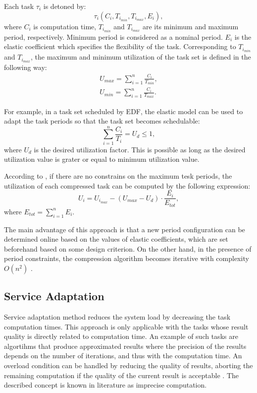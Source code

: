 Each task $\tau_i$ is detoned by:
\begin{equation*}
\tau_i(C_i, T_{i_{min}}, T_{i_{max}}, E_i),
\end{equation*}
where $C_i$ is computation time, $T_{i_{min}}$ and $T_{i_{max}}$ are its minimum and maximum period, respectively.
Minimum period is considered as a nominal period. 
 $E_i$ is the elastic coefficient which specifies the flexibility of the task.
Corresponding to $T_{i_{min}}$ and $T_{i_{max}}$, the maximum and minimum utilization of the task set is defined in the following way:
\begin{align*}
U_{max} = \sum_{i=1}^{n}\frac{C_i}{T_{min}},\\
U_{min} = \sum_{i=1}^{n}\frac{C_i}{T_{max}}.
\end{align*}

For example, in a task set scheduled by EDF, the elastic model can be used to adapt the task periods so that the task set becomes schedulable:
\begin{equation*}
\sum_{i=1}^{n}\frac{C_i}{T_i} = U_d \leq 1,
\end{equation*}
where $U_d$ is the desired utilization factor.
This is possible as long as the desired utilization value is grater or equal to minimum utilization value.

According to \cite{lee2007handbook}, if there are no constrains on the maximum tesk periods, the utilization of each compressed task can be computed by the following expression:
\begin{equation*}
U_i = U_{i_{max}} - ( U_{max} - U_d ) \cdot \frac{E_i}{E_{tot}},
\end{equation*}
where \( E_{tot} = \sum_{i=1}^{n}E_i \).

The main advantage of this approach is that a new period configuration can be determined online based on the values of elastic coefficients, which are set beforehand based on some design criterion.
On the other hand, in the presence of period constraints, the compression algorithm becomes iterative with complexity \( O(n^2) \) \cite{lee2007handbook}.

\subsection{Service Adaptation}
Service adaptation method reduces the system load by decreasing the task computation times. 
This approach is only applicable with the tasks whose result quality is directly related to computation time.
An example of such tasks are algortihms that produce approximated results where the precision of the results depends on the number of iterations, and thus with the computation time. 
An overload condition can be handled by reducing the quality of results, aborting the remaining computation if the quality of the current result is acceptable \cite{shih1989scheduling}. 
The described concept is known in literature as imprecise computation. 



